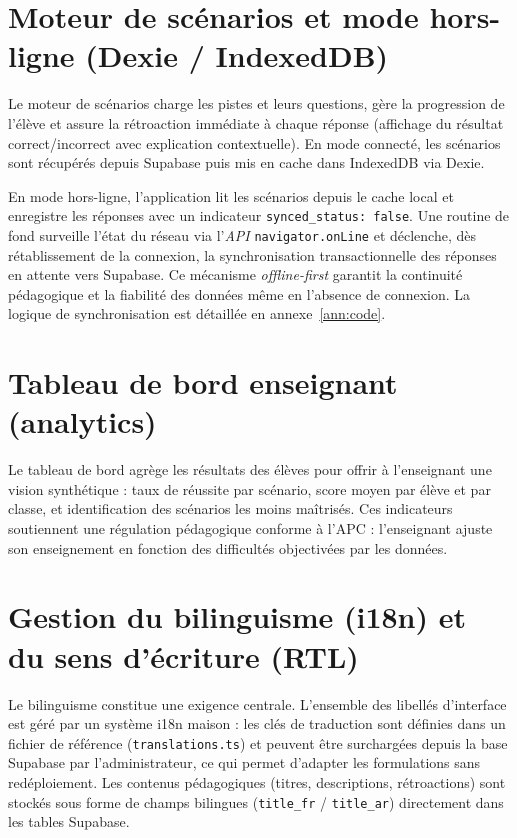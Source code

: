 \documentclass[12pt, a4paper, oneside]{report}
\begin{document}
\section{Moteur de scénarios et mode hors-ligne (Dexie / IndexedDB)}
Le moteur de scénarios charge les pistes et leurs questions, gère la progression de l'élève et assure la rétroaction immédiate à chaque réponse (affichage du résultat correct/incorrect avec explication contextuelle). En mode connecté, les scénarios sont récupérés depuis Supabase puis mis en cache dans IndexedDB via Dexie.

En mode hors-ligne, l'application lit les scénarios depuis le cache local et enregistre les réponses avec un indicateur \texttt{synced\_status: false}. Une routine de fond surveille l'état du réseau via l'\textit{API} \texttt{navigator.onLine} et déclenche, dès rétablissement de la connexion, la synchronisation transactionnelle des réponses en attente vers Supabase. Ce mécanisme \textit{offline-first} garantit la continuité pédagogique et la fiabilité des données même en l'absence de connexion. La logique de synchronisation est détaillée en annexe~\ref{ann:code}.

\section{Tableau de bord enseignant (analytics)}
Le tableau de bord agrège les résultats des élèves pour offrir à l'enseignant une vision synthétique : taux de réussite par scénario, score moyen par élève et par classe, et identification des scénarios les moins maîtrisés. Ces indicateurs soutiennent une régulation pédagogique conforme à l'APC : l'enseignant ajuste son enseignement en fonction des difficultés objectivées par les données.

\section{Gestion du bilinguisme (i18n) et du sens d'écriture (RTL)}
Le bilinguisme constitue une exigence centrale. L'ensemble des libellés d'interface est géré par un système i18n maison : les clés de traduction sont définies dans un fichier de référence (\texttt{translations.ts}) et peuvent être surchargées depuis la base Supabase par l'administrateur, ce qui permet d'adapter les formulations sans redéploiement. Les contenus pédagogiques (titres, descriptions, rétroactions) sont stockés sous forme de champs bilingues (\texttt{title\_fr} / \texttt{title\_ar}) directement dans les tables Supabase.
\end{document}
